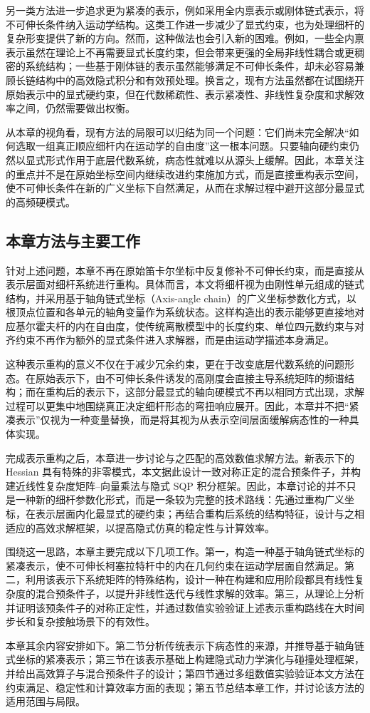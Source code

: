 另一类方法进一步追求更为紧凑的表示，例如采用全内禀表示或刚体链式表示，将不可伸长条件纳入运动学结构。这类工作进一步减少了显式约束，也为处理细杆的复杂形变提供了新的方向。然而，这种做法也会引入新的困难。例如，一些全内禀表示虽然在理论上不再需要显式长度约束，但会带来更强的全局非线性耦合或更稠密的系统结构；一些基于刚体链的表示虽然能够满足不可伸长条件，却未必容易兼顾长链结构中的高效隐式积分和有效预处理。换言之，现有方法虽然都在试图绕开原始表示中的显式硬约束，但在代数稀疏性、表示紧凑性、非线性复杂度和求解效率之间，仍然需要做出权衡。

从本章的视角看，现有方法的局限可以归结为同一个问题：它们尚未完全解决“如何选取一组真正顺应细杆内在运动学的自由度”这一根本问题。只要轴向硬约束仍然以显式形式作用于底层代数系统，病态性就难以从源头上缓解。因此，本章关注的重点并不是在原始坐标空间内继续改进约束施加方式，而是直接重构表示空间，使不可伸长条件在新的广义坐标下自然满足，从而在求解过程中避开这部分最显式的高频硬模式。

\subsection{本章方法与主要工作}

针对上述问题，本章不再在原始笛卡尔坐标中反复修补不可伸长约束，而是直接从表示层面对细杆系统进行重构。具体而言，本文将细杆视为由刚性单元组成的链式结构，并采用基于轴角链式坐标（Axis-angle chain）的广义坐标参数化方式，以根顶点位置和各单元的轴角变量作为系统状态。这样构造出的表示能够更直接地对应基尔霍夫杆的内在自由度，使传统离散模型中的长度约束、单位四元数约束与对齐约束不再作为额外的显式条件进入求解器，而是由运动学描述本身满足。

这种表示重构的意义不仅在于减少冗余约束，更在于改变底层代数系统的问题形态。在原始表示下，由不可伸长条件诱发的高刚度会直接主导系统矩阵的频谱结构；而在重构后的表示下，这部分最显式的轴向硬模式不再以相同方式出现，求解过程可以更集中地围绕真正决定细杆形态的弯扭响应展开。因此，本章并不把“紧凑表示”仅视为一种变量替换，而是将其视为从表示空间层面缓解病态性的一种具体实现。

完成表示重构之后，本章进一步讨论与之匹配的高效数值求解方法。新表示下的 Hessian 具有特殊的非零模式，本文据此设计一致对称正定的混合预条件子，并构建近线性复杂度矩阵--向量乘法与隐式 SQP 积分框架。因此，本章讨论的并不只是一种新的细杆参数化形式，而是一条较为完整的技术路线：先通过重构广义坐标，在表示层面内化最显式的硬约束；再结合重构后系统的结构特征，设计与之相适应的高效求解框架，以提高隐式仿真的稳定性与计算效率。

围绕这一思路，本章主要完成以下几项工作。第一，构造一种基于轴角链式坐标的紧凑表示，使不可伸长柯塞拉特杆中的内在几何约束在运动学层面自然满足。第二，利用该表示下系统矩阵的特殊结构，设计一种在构建和应用阶段都具有线性复杂度的混合预条件子，以提升非线性迭代与线性求解的效率。第三，从理论上分析并证明该预条件子的对称正定性，并通过数值实验验证上述表示重构路线在大时间步长和复杂接触场景下的有效性。

本章其余内容安排如下。第二节分析传统表示下病态性的来源，并推导基于轴角链式坐标的紧凑表示；第三节在该表示基础上构建隐式动力学演化与碰撞处理框架，并给出高效算子与混合预条件子的设计；第四节通过多组数值实验验证本文方法在约束满足、稳定性和计算效率方面的表现；第五节总结本章工作，并讨论该方法的适用范围与局限。

